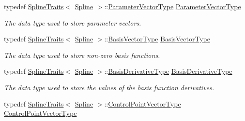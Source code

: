 \begin{DoxyCompactItemize}
\mbox{\label{group___splines___module_a04bcc878ef5c8316e8cc60b4cf00d77c}} 
typedef \hyperlink{struct_eigen_1_1_spline_traits}{Spline\+Traits}$<$ \hyperlink{group___splines___module_class_eigen_1_1_spline}{Spline} $>$\+::\hyperlink{group___splines___module_a04bcc878ef5c8316e8cc60b4cf00d77c}{Parameter\+Vector\+Type} \hyperlink{group___splines___module_a04bcc878ef5c8316e8cc60b4cf00d77c}{Parameter\+Vector\+Type}
\begin{DoxyCompactList}\small\item\em The data type used to store parameter vectors. \end{DoxyCompactList}\item 
\mbox{\label{group___splines___module_a1d49cef942ea59d85d1711ee32354e6b}} 
typedef \hyperlink{struct_eigen_1_1_spline_traits}{Spline\+Traits}$<$ \hyperlink{group___splines___module_class_eigen_1_1_spline}{Spline} $>$\+::\hyperlink{group___splines___module_a1d49cef942ea59d85d1711ee32354e6b}{Basis\+Vector\+Type} \hyperlink{group___splines___module_a1d49cef942ea59d85d1711ee32354e6b}{Basis\+Vector\+Type}
\begin{DoxyCompactList}\small\item\em The data type used to store non-\/zero basis functions. \end{DoxyCompactList}\item 
\mbox{\label{group___splines___module_a9db0b0108353660cd03524f2e67d6b3c}} 
typedef \hyperlink{struct_eigen_1_1_spline_traits}{Spline\+Traits}$<$ \hyperlink{group___splines___module_class_eigen_1_1_spline}{Spline} $>$\+::\hyperlink{group___splines___module_a9db0b0108353660cd03524f2e67d6b3c}{Basis\+Derivative\+Type} \hyperlink{group___splines___module_a9db0b0108353660cd03524f2e67d6b3c}{Basis\+Derivative\+Type}
\begin{DoxyCompactList}\small\item\em The data type used to store the values of the basis function derivatives. \end{DoxyCompactList}\item 
\mbox{\label{group___splines___module_ac42c673462a98ad1779761bebeb450bf}} 
typedef \hyperlink{struct_eigen_1_1_spline_traits}{Spline\+Traits}$<$ \hyperlink{group___splines___module_class_eigen_1_1_spline}{Spline} $>$\+::\hyperlink{group___splines___module_ac42c673462a98ad1779761bebeb450bf}{Control\+Point\+Vector\+Type} \hyperlink{group___splines___module_ac42c673462a98ad1779761bebeb450bf}{Control\+Point\+Vector\+Type}

\end{DoxyCompactItemize}
